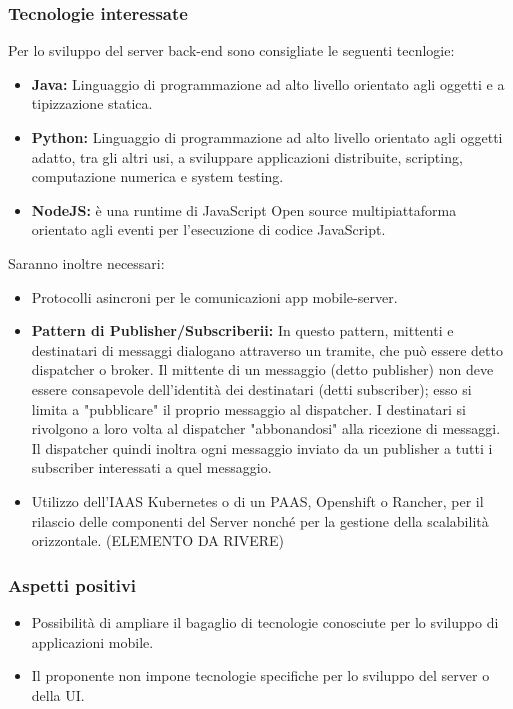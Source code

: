 	\subsubsection{Tecnologie interessate}
		Per lo sviluppo del server back-end sono consigliate le seguenti tecnlogie: 
		\begin{itemize}
			\item \textbf{Java:} Linguaggio di programmazione ad alto livello orientato agli oggetti e a tipizzazione statica.
			\item \textbf{Python:} Linguaggio di programmazione ad alto livello orientato agli oggetti adatto, tra gli altri usi, a sviluppare applicazioni distribuite, scripting, computazione numerica e system testing.
			\item \textbf{NodeJS:} è una runtime di JavaScript Open source multipiattaforma orientato agli eventi per l'esecuzione di codice JavaScript.
		\end{itemize}
		Saranno inoltre necessari: 
		\begin{itemize}
			\item Protocolli asincroni per le comunicazioni app mobile-server.
			\item \textbf{Pattern di Publisher/Subscriberii:} In questo pattern, mittenti e destinatari di messaggi dialogano attraverso un tramite, che può essere detto dispatcher o broker. Il mittente di un messaggio (detto publisher) non deve essere consapevole dell'identità dei destinatari (detti subscriber); esso si limita a "pubblicare" il proprio messaggio al dispatcher. I destinatari si rivolgono a loro volta al dispatcher "abbonandosi" alla ricezione di messaggi. Il dispatcher quindi inoltra ogni messaggio inviato da un publisher a tutti i subscriber interessati a quel messaggio.
			\item Utilizzo dell’IAAS Kubernetes o di un PAAS, Openshift o Rancher, per il rilascio delle componenti del Server nonché per la gestione della scalabilità orizzontale. 
			(ELEMENTO DA RIVERE)
		\end{itemize}

	\subsubsection{Aspetti positivi}
		\begin{itemize}
			\item Possibilità di ampliare il bagaglio di tecnologie conosciute per lo sviluppo di applicazioni mobile.
			\item Il proponente non impone tecnologie specifiche per lo sviluppo del server o
			della UI.
		\end{itemize}

